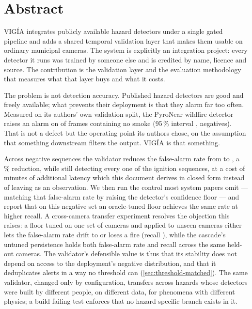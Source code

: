 \section*{Abstract}

VIGÍA integrates publicly available hazard detectors under a single gated
pipeline and adds a shared temporal validation layer that makes them usable on
ordinary municipal cameras. The system is explicitly an integration project:
every detector it runs was trained by someone else and is credited by name,
licence and source. The contribution is the validation layer and the
evaluation methodology that measures what that layer buys and what it costs.

The problem is not detection accuracy. Published hazard detectors are good and
freely available; what prevents their deployment is that they alarm far too
often. Measured on its authors' own validation split, the PyroNear wildfire
detector raises an alarm on \FireImageFAR{} of frames containing no smoke
(95\,\% interval \FireImageFARCI, \FireNegatives{} negatives). That is not a
defect but the operating point its authors chose, on the assumption that
something downstream filters the output. VIGÍA is that something.

Across \AblationNegativeSequences{} negative sequences the validator reduces
the false-alarm rate from \RawFAR{} to \ValidatedFAR{}, a \FARReduction\,\%
reduction, while still detecting every one of the \FiresTotal{} ignition
sequences, at a cost of \AddedMinutesToDetect{} minutes of additional latency
which this document derives in closed form instead of leaving as an observation. We then
run the control most system papers omit — matching that false-alarm rate by
raising the detector's confidence floor — and report that on this negative set
an oracle-tuned floor achieves the same rate at higher recall. A
cross-camera transfer experiment resolves the objection this raises: a floor
tuned on one set of cameras and applied to unseen cameras either lets the
false-alarm rate drift to \TransferTestFAR{} or loses a fire (recall
\TransferBARecall), while the cascade's untuned persistence holds both
false-alarm rate and recall across the same held-out cameras. The validator's
defensible value is thus that its stability does not depend on access to the
deployment's negative distribution, and that it deduplicates alerts in a way
no threshold can (\cref{sec:threshold-matched}). The same validator, changed
only by configuration, transfers across hazards whose detectors were built by
different people, on different data, for phenomena with different physics; a
build-failing test enforces that no hazard-specific branch exists in it.

